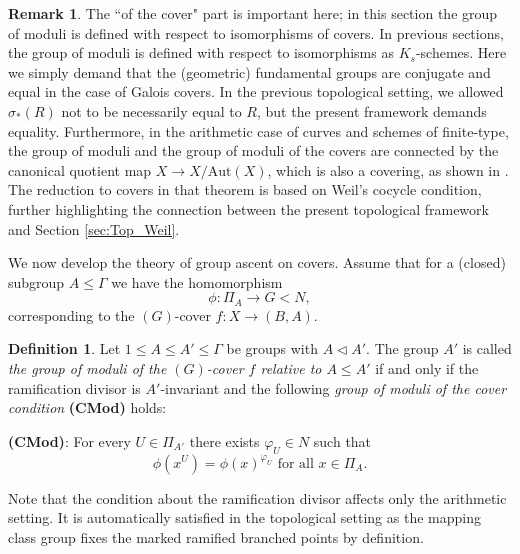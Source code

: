 \documentclass[10pt]{amsart}
\theoremstyle{definition}
\newtheorem{remark}[theorem]{Remark}
\newtheorem{definition}[theorem]{Definition}
\begin{document}
\begin{remark}
    The “of the cover" part is important here; in this section the group of moduli is defined with respect to isomorphisms of covers. In previous sections, the group of moduli is defined with respect to isomorphisms as $K_s$-schemes. Here we simply demand that the (geometric) fundamental groups are conjugate and equal in the case of Galois covers. In the previous topological setting, we allowed $\sigma_*(R)$ not to be necessarily equal to $R$, but the present framework demands equality. 
    Furthermore, in the arithmetic case of curves and schemes of finite-type, the group of moduli and the group of moduli of the covers are connected by the canonical quotient map $X\rightarrow X/\mathrm{Aut}(X)$, which is also a covering, as shown in \cite[Thm. 3.1]{DebesEmsalem}. The reduction to covers in that theorem is based on Weil’s cocycle condition, further highlighting the connection between the present topological framework and Section \ref{sec:Top_Weil}.
\end{remark}

We now develop the theory of group ascent on covers. Assume that for a (closed) subgroup $A\leq \mathfrak{\Gamma}$ we have the homomorphism
\[
  \phi\colon \Pi_A \rightarrow  G < N,
\]
corresponding to the $(G)$-cover $f\colon X \rightarrow (B,A)$. 



\begin{definition}\label{def:groupofModuliCovers}
Let $1 \leq A \leq A' \leq \mathfrak{\Gamma}$ be groups with $A \lhd A'$. 
The group $A'$ is called {\em the group of moduli of the $(G)$-cover $f$ relative to $A \leq A'$} if and only if the ramification divisor is $A'$-invariant and the following {\em group of moduli of the cover condition} \textbf{(CMod)} holds: 

\textbf{(CMod)}: For every $U \in \Pi_{A'}$ there exists $\varphi_U\in N$ such that
\[
\phi(x^U) = \phi(x)^{\varphi_U} \text{ for all } x \in \Pi_A.  
\]
\end{definition}
Note that the condition about the ramification divisor affects only the arithmetic setting. It is automatically satisfied in the topological setting as the mapping class group fixes the marked ramified branched points by definition.
\end{document}
